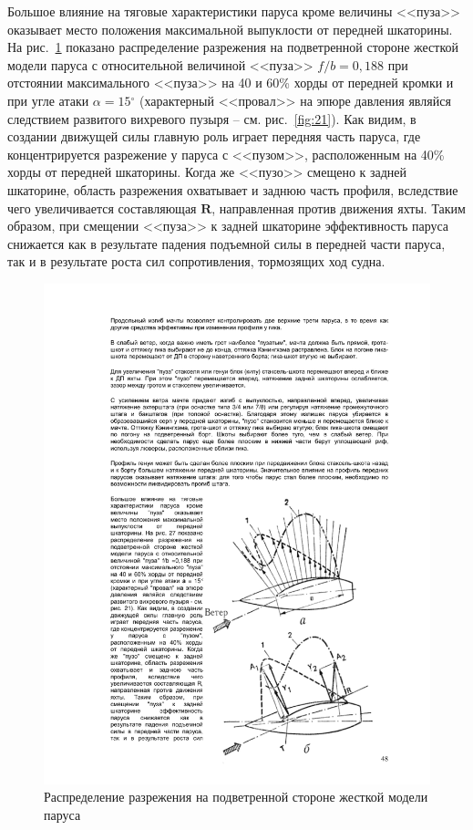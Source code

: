 \documentclass[a4paper, 12pt, twoside, final, book, russian, fittopage, cyremdash]{ncc}
\newcommand{\ve}[1]{\ensuremath{\mathbf{#1}}\xspace}
\newcommand{\gr}{\ensuremath{^\circ}\xspace}
\newcommand{\ris}[1]{\ref{fig:#1}}
\begin{document}
Большое влияние на тяговые характеристики паруса кроме величины <<пуза>> оказывает место положения максимальной выпуклости от передней шкаторины. На рис.~\ris{27} показано распределение разрежения на подветренной стороне жесткой модели паруса с относительной величиной <<пуза>> $f/b = 0,188$ при отстоянии максимального <<пуза>> на 40 и 60\% хорды от передней кромки и при угле атаки $\alpha = 15\gr$ (характерный <<провал>> на эпюре давления являйся следствием развитого вихревого пузыря \--- см. рис.~\ris{21}). Как видим, в создании движущей силы главную роль играет передняя часть паруса, где концентрируется разрежение у паруса с <<пузом>>, расположенным на 40\% хорды от передней шкаторины. Когда же <<пузо>> смещено к задней шкаторине, область разрежения охватывает и заднюю часть профиля, вследствие чего увеличивается составляющая \ve R, направленная против движения яхты. Таким образом, при смещении <<пуза>> к задней шкаторине эффективность паруса снижается как в результате падения подъемной силы в передней части паруса, так и в результате роста сил сопротивления, тормозящих ход судна.

\begin{figure}[htb]
  \centering
  \includegraphics[scale=1]{0027}
  \caption{Распределение разрежения на подветренной стороне жесткой модели паруса}
  \label{fig:27}
\end{figure}
\end{document}
